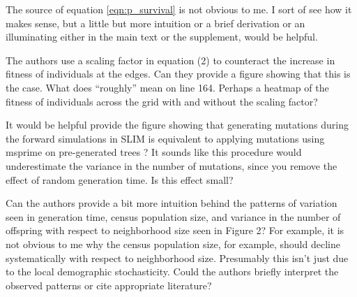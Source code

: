 \begin{point}{}
    The source of equation \eqref{eqn:p_survival} is not obvious to me. I sort of see how it makes sense, but a little but more intuition or a brief derivation or an illuminating either in the main text or the supplement, would be helpful.
\end{point}


\begin{point}{}
    The authors use a scaling factor in equation (2) to counteract the increase in fitness of individuals at the edges. Can they provide a figure showing that this is the case. What does ``roughly'' mean on line 164. Perhaps a heatmap of the fitness of individuals across the grid with and without the scaling factor?
\end{point}


\begin{point}{}
    It would be helpful provide the figure showing that generating mutations during the forward simulations in SLIM is equivalent to applying mutations using msprime on pre-generated trees \revref? It sounds like this procedure would underestimate the variance in the number of mutations, since you remove the effect of random generation time. Is this effect small?
\end{point}


\begin{point}{}
    Can the authors provide a bit more intuition behind the patterns of variation seen in generation time, census population size, and variance in the number of offspring with respect to neighborhood size seen in Figure 2? For example, it is not obvious to me why the census population size, for example, should decline systematically with respect to neighborhood size. Presumably this isn't just due to the local demographic stochasticity. Could the authors briefly interpret the observed patterns or cite appropriate literature?
\end{point}

